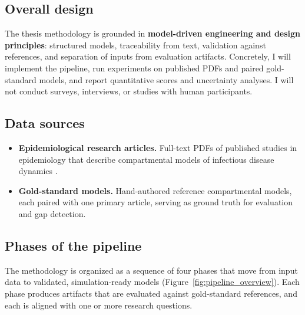 \documentclass[a4paper,12pt]{article}
\begin{document}
\subsection{Overall design}

The thesis methodology is grounded in \textbf{model-driven engineering and design principles}: structured models, traceability from text, validation against references, and separation of inputs from evaluation artifacts. Concretely, I will implement the pipeline, run experiments on published PDFs and paired gold-standard models, and report quantitative scores and uncertainty analyses. I will not conduct surveys, interviews, or studies with human participants.

\subsection{Data sources}

\begin{itemize}[leftmargin=*]
  \item \textbf{Epidemiological research articles.} Full-text PDFs of published studies in epidemiology that describe compartmental models of infectious disease dynamics \citep{keeling2008modeling}.
  \item \textbf{Gold-standard models.} Hand-authored reference compartmental models, each paired with one primary article, serving as ground truth for evaluation and gap detection.
\end{itemize}
\subsection{Phases of the pipeline}

The methodology is organized as a sequence of four phases that move from input data to validated, simulation-ready models (Figure~\ref{fig:pipeline_overview}). Each phase produces artifacts that are evaluated against gold-standard references, and each is aligned with one or more research questions.
\end{document}
